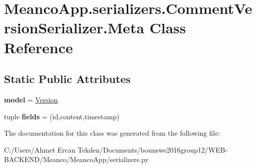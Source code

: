 \hypertarget{class_meanco_app_1_1serializers_1_1_comment_version_serializer_1_1_meta}{}\section{Meanco\+App.\+serializers.\+Comment\+Version\+Serializer.\+Meta Class Reference}
\label{class_meanco_app_1_1serializers_1_1_comment_version_serializer_1_1_meta}
\subsection*{Static Public Attributes}
\begin{DoxyCompactItemize}
\item 
\hypertarget{class_meanco_app_1_1serializers_1_1_comment_version_serializer_1_1_meta_a51e67db2f35bcbc5ba3aa514d643eae5}{}\label{class_meanco_app_1_1serializers_1_1_comment_version_serializer_1_1_meta_a51e67db2f35bcbc5ba3aa514d643eae5} 
{\bfseries model} = \hyperlink{class_meanco_app_1_1models_1_1comment_1_1_version}{Version}
\item 
\hypertarget{class_meanco_app_1_1serializers_1_1_comment_version_serializer_1_1_meta_a823beae0b6df23a6114b608fb633af4a}{}\label{class_meanco_app_1_1serializers_1_1_comment_version_serializer_1_1_meta_a823beae0b6df23a6114b608fb633af4a} 
tuple {\bfseries fields} = (\textquotesingle{}id\textquotesingle{},\textquotesingle{}content\textquotesingle{},\textquotesingle{}timestamp\textquotesingle{})
\end{DoxyCompactItemize}


The documentation for this class was generated from the following file\+:\begin{DoxyCompactItemize}
\item 
C\+:/\+Users/\+Ahmet Ercan Tekden/\+Documents/bounswe2016group12/\+W\+E\+B-\/\+B\+A\+C\+K\+E\+N\+D/\+Meanco/\+Meanco\+App/serializers.\+py\end{DoxyCompactItemize}
